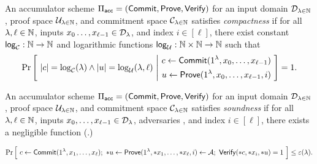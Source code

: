 \newcommand{\polylog}{\ms{polylog}}
\newcommand{\len}{\ms{len}}
\newcommand{\logg}{{\ms{log}}}

\begin{definition}[Compactness]
    \label{def:compactness}
    An accumulator scheme $\Pi_{\mathsf{acc}} = (\mathsf{Commit}, \mathsf{Prove}, \mathsf{Verify})$ for an input
    domain $\mathcal{D}_{\lambda \in \mathbb{N}}$, proof space $\mathcal{U}_{\lambda \in \mathbb{N}}$, and
    commitment space $\mathcal{C}_{\lambda \in \mathbb{N}}$ satisfies \emph{compactness}
    if for all $\lambda, \ell \in \mathbb{N}$, inputs $x_0 \ldots, x_{\ell-1} \in
    \mathcal{D}_\lambda$, and index $i \in [\ell]$, there exist constant $\logg_\calC:
    \N \to \N$ and logarithmic functions $\logg_{\calU}: \N \times \N \to \N$
    such that
    \[ \Pr \left[~ |c| = \log_{\mathcal{C}}(\lambda) \land |u| = \log_{\mathcal{U}}(\lambda,
        \ell) ~\Bigg|~ \begin{aligned} c \gets \mathsf{Commit}(1^\lambda, x_0, \ldots,
        x_{\ell-1}) \\ u \gets \mathsf{Prove}(1^\lambda, x_0, \ldots, x_{\ell-1}, i) 
        \end{aligned} ~\right] = 1 .\]
\end{definition}

\begin{definition}[Soundness]
    \label{def:soundness}
    An accumulator scheme $\Pi_{\mathsf{acc}} = (\mathsf{Commit}, \mathsf{Prove}, \mathsf{Verify})$ for an input
    domain $\mathcal{D}_{\lambda \in \mathbb{N}}$, proof space $\mathcal{U}_{\lambda \in \mathbb{N}}$, and
    commitment space $\mathcal{C}_{\lambda \in \mathbb{N}}$ satisfies \emph{soundness} if
    for all $\lambda, \ell \in \mathbb{N}$, inputs $x_0, \ldots, x_{\ell-1} \in
    \mathcal{D}_\lambda$, adversaries \calA, and index $i \in [\ell]$, there exists 
    a negligible function \varepsilon(.)

    \[ \Pr \Big[~ c \gets \mathsf{Commit}(1^\lambda, x_1, \ldots, x_\ell) ;~ *u \gets
        \mathsf{Prove}(1^\lambda, *x_1, \ldots, *x_\ell, i) \gets \mathcal{A};~ \mathsf{Verify}(*c, *x_i, *u) = 1
        ~\Big] \leq \varepsilon(\lambda) .\]
\end{definition}

